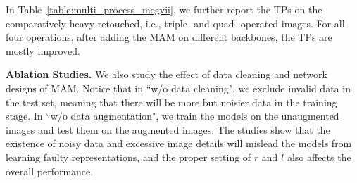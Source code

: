 \documentclass[sigconf]{acmart}
\begin{document}
In Table~\ref{table:multi_process_megvii}, we further report the TPs on the comparatively heavy retouched, i.e., triple- and quad- operated images.
For all four operations, after adding the MAM on different backbones, the TPs are mostly improved.

\noindent\textbf{Ablation Studies.}
We also study the effect of data cleaning and network designs of MAM.
Notice that in ``w/o data cleaning", we exclude invalid data in the test set, meaning that there will be more but noisier data in the training stage.
In ``w/o data augmentation", we train the models on the unaugmented images and test them on the augmented images.
The studies show that the existence of noisy data and excessive image details will mislead the models from learning faulty representations, and the proper setting of $r$ and $l$ also affects the overall performance.
\end{document}
